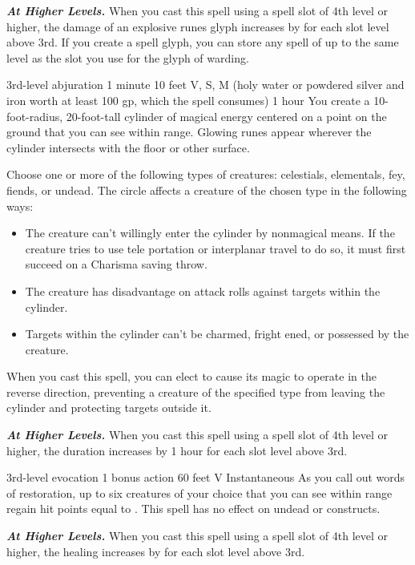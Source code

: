 \documentclass[10pt,twoside,twocolumn,openany]{book}
\newcommand{\castingModifier}{3}
\newcommand\impact[1]{
	\textbf{\textit{#1}}
}
\begin{document}
\impact{At Higher Levels.} When you cast this spell using a spell slot of 4th level or higher, the damage of an explosive runes glyph increases by  for each slot level above 3rd. If you create a spell glyph, you can store any spell of up to the same level as the slot you use for the glyph of warding.

{3rd-level abjuration}
{1 minute}
{10 feet}
{V, S, M (holy water or powdered silver and iron worth at least {\color{cost}100 gp}, which the spell consumes)}
{1 hour}
You create a 10-foot-radius, 20-foot-tall cylinder of magical energy centered on a point on the ground that you can see within range. Glowing runes appear wherever the cylinder intersects with the floor or other surface.

Choose one or more of the following types of creatures: celestials, elementals, fey, fiends, or undead. The circle affects a creature of the chosen type in the following ways:
\begin{itemize}
	\item The creature can't willingly enter the cylinder by nonmagical means. If the creature tries to use tele  portation or interplanar travel to do so, it must first succeed on a Charisma saving throw.
	\item The creature has disadvantage on attack rolls against targets within the cylinder.
	\item Targets within the cylinder can't be charmed, fright  ened, or possessed by the creature.
\end{itemize}
When you cast this spell, you can elect to cause its magic to operate in the reverse direction, preventing a creature of the specified type from leaving the cylinder and protecting targets outside it.

\impact{At Higher Levels.} When you cast this spell using a spell slot of 4th level or higher, the duration increases by 1 hour for each slot level above 3rd.

{3rd-level evocation}
{\color{bonusaction} 1 bonus action}
{60 feet}
{V}
{Instantaneous}
As you call out words of restoration, up to six creatures of your choice that you can see within range regain hit points equal to \dice{1d4 + \castingModifier}. This spell has no effect on undead or constructs.

\impact{At Higher Levels.} When you cast this spell using a spell slot of 4th level or higher, the healing increases by  for each slot level above 3rd.
\end{document}

